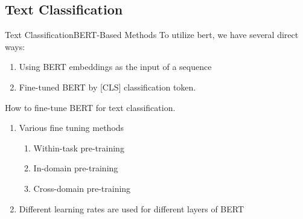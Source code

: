 \documentclass[xcolor=dvipsnames]{beamer}
\begin{document}
\subsection{Text Classification}
\begin{frame}{Text Classification}{BERT-Based Methods}
  To utilize bert, we have several direct ways:
  \begin{enumerate}
      \item Using BERT embeddings as the input of a sequence
      \item Fine-tuned BERT by [CLS] classification token.
  \end{enumerate}
  
\end{frame}

\begin{frame}
How to fine-tune BERT for text classification.\cite{sun2019finetune}
  \begin{enumerate}
    \item Various fine tuning methods
    \begin{enumerate}
        \item Within-task pre-training
        \item In-domain pre-training
        \item Cross-domain pre-training
    \end{enumerate}
    
    \item Different learning rates are used for different layers of BERT
\end{enumerate}

\end{frame}
\end{document}
